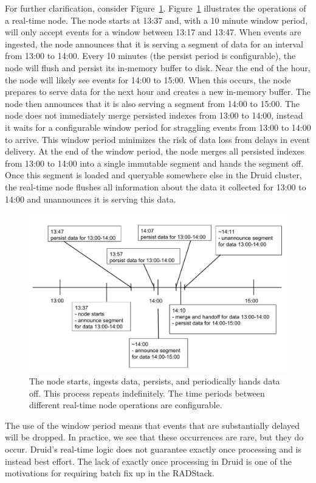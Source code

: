 \documentclass{vldb}
\begin{document}
For further clarification, consider Figure~\ref{fig:realtime_timeline}.
Figure~\ref{fig:realtime_timeline} illustrates the operations of a real-time
node. The node starts at 13:37 and, with a 10 minute window period, will only
accept events for a window between 13:17 and 13:47.  When events are ingested,
the node announces that it is serving a segment of data for an interval from
13:00 to 14:00. Every 10 minutes (the persist period is configurable), the node
will flush and persist its in-memory buffer to disk.  Near the end of the hour,
the node will likely see events for 14:00 to 15:00.  When this occurs, the node
prepares to serve data for the next hour and creates a new in-memory buffer.
The node then announces that it is also serving a segment from 14:00 to 15:00.
The node does not immediately merge persisted indexes from 13:00 to 14:00,
instead it waits for a configurable window period for straggling events from
13:00 to 14:00 to arrive. This window period minimizes the risk of data loss
from delays in event delivery. At the end of the window period, the node merges
all persisted indexes from 13:00 to 14:00 into a single immutable segment and
hands the segment off. Once this segment is loaded and queryable somewhere else
in the Druid cluster, the real-time node flushes all information about the data
it collected for 13:00 to 14:00 and unannounces it is serving this data.

\begin{figure}
\centering
\includegraphics[width = 4.5in]{realtime_timeline}
\caption{The node starts, ingests data, persists, and periodically hands data
off. This process repeats indefinitely. The time periods between different
real-time node operations are configurable.}
\label{fig:realtime_timeline}
\end{figure}

The use of the window period means that events that are substantially delayed
will be dropped. In practice, we see that these occurrences are rare, but they
do occur. Druid’s real-time logic does not guarantee exactly once processing
and is instead best effort. The lack of exactly once processing in Druid is one
of the motivations for requiring batch fix up in the RADStack.
\end{document}
